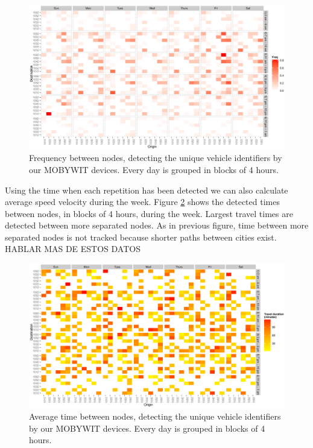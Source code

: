 \documentclass[preprint]{elsarticle}
\begin{document}


\begin{figure}[htb]
	\begin{center}
		\includegraphics[scale=0.4]{imgs/petra_matrix_freq.eps}
		\caption{Frequency between nodes, detecting the unique vehicle identifiers by our MOBYWIT devices. Every day is grouped in blocks of 4 hours.}
	\label{fig:dgtMatrixFrec}
	\end{center}
\end{figure}

Using the time when each repetition has been detected we can also calculate average speed velocity during the week. Figure \ref{fig:dgtMatrixTime} shows the detected times between nodes, in blocks of 4 hours, during the week. Largest travel times are detected between more separated nodes. As in previous figure, time between more separated nodes is not tracked because shorter paths between cities exist. HABLAR MAS DE ESTOS DATOS

\begin{figure}[htb]
	\begin{center}
		\includegraphics[scale=0.35]{imgs/petra_matrix_travelDuration.eps}
		\caption{Average time between nodes, detecting the unique vehicle identifiers by our MOBYWIT devices. Every day is grouped in blocks of 4 hours.}
	\label{fig:dgtMatrixTime}
	\end{center}
\end{figure}
\end{document}
